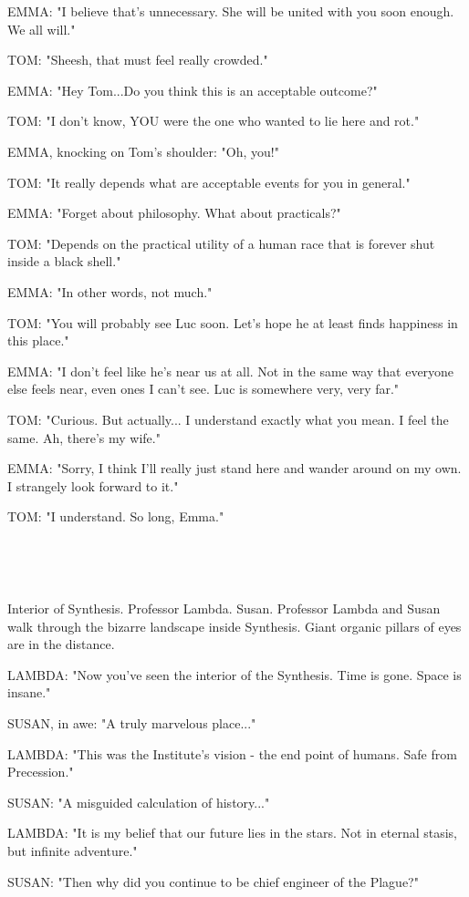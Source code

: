 \documentclass[11pt]{article}
\begin{document}
EMMA: "I believe that's unnecessary. 
She will be united with you soon enough.
We all will."

TOM: "Sheesh, that must feel really crowded."

EMMA: "Hey Tom...Do you think this is an acceptable outcome?"

TOM: "I don't know, YOU were the one who wanted to lie here and rot."

EMMA, knocking on Tom's shoulder: "Oh, you!"

TOM: "It really depends what are acceptable events for you in general."

EMMA: "Forget about philosophy.
What about practicals?"

TOM: "Depends on the practical utility of a human race that is forever shut inside a black shell."

EMMA: "In other words, not much."

TOM: "You will probably see Luc soon.
Let's hope he at least finds happiness in this place."

EMMA: "I don't feel like he's near us at all.
Not in the same way that everyone else feels near, even ones I can't see.
Luc is somewhere very, very far."

TOM: "Curious. But actually... I understand exactly what you mean.
I feel the same.
Ah, there's my wife."

EMMA: "Sorry, I think I'll really just stand here and wander around on my own.
I strangely look forward to it."

TOM: "I understand. So long, Emma."

\ 

\ 

Interior of Synthesis.
Professor Lambda. Susan. 
Professor Lambda and Susan walk through the bizarre landscape inside Synthesis.
Giant organic pillars of eyes are in the distance.

LAMBDA: "Now you've seen the interior of the Synthesis.
Time is gone. Space is insane."

SUSAN, in awe: "A truly marvelous place..."

LAMBDA: "This was the Institute's vision - the end point of humans. 
Safe from Precession."

SUSAN: "A misguided calculation of history..."

LAMBDA: "It is my belief that our future lies in the stars. 
Not in eternal stasis, but infinite adventure."

SUSAN: "Then why did you continue to be chief engineer of the Plague?"
\end{document}

